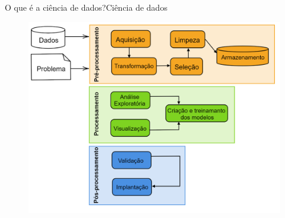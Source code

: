 \documentclass[t]{beamer}
\begin{document}
\begin{ftst}{O que é a ciência de dados?}{Ciência de dados}

\begin{figure}
    \centering
    \includegraphics[scale=0.15]{Figuras/slide00_07.png}
\end{figure}
\end{ftst}

\end{document}
